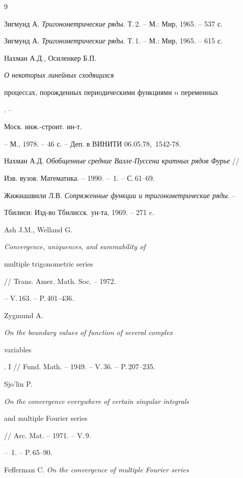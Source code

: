 \begin{thebibliography}{9}







Зигмунд А. {\em Тригонометрические ряды}. Т.\,2. -- М.: Мир, 1965. -- 537 с.




Зигмунд А. {\em Тригонометрические ряды}. Т.\,1. -- М.: Мир, 1965. -- 615 с.




Нахман А.Д., Осиленкер Б.П. {\em О некоторых линейных сходящихся


процессах, порожденных периодическими функциями $n$ переменных}. --


Моск. инж.-строит. ин-т.


-- М., 1978. -- 46 с. -- Деп. в ВИНИТИ 06.05.78, \No\,1542-78.




Нахман А.Д. {\em Обобщенные средние Валле-Пуссена кратных рядов Фурье} //


Изв. вузов. Математика. -- 1990. -- \No\,1. -- С.\,61--69.




Жижиашвили Л.В. {\em Сопряженные функции и тригонометрические ряды}. --


Тбилиси: Изд-во Тбилисск. ун-та, 1969. -- 271 c.




Ash J.M., Welland G. {\em Convergence, uniquences, and summability of


multiple trigonometric series} // Trans. Amer. Math. Soc. -- 1972.


-- V.\,163. -- P.\,401--436.




Zygmund A. {\em On the boundary values of function of several complex


variables}. I // Fund. Math. -- 1949. -- V.\,36. -- P.\,207--235.




Sjo'lin P. {\em On the convergence everywhere of certain singular integrals


and multiple Fourier series} // Arc. Mat. -- 1971. -- V.\,9.


-- \No\,1. -- P.\,65--90.




Fefferman C. {\em On the convergence of multiple Fourier series}



\end{thebibliography}
